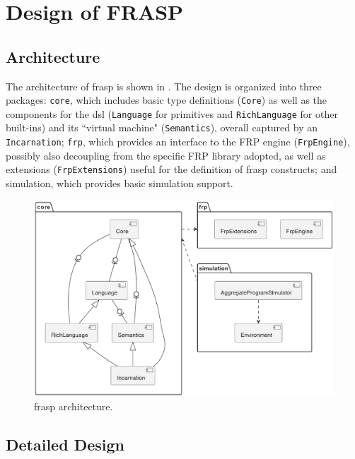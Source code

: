 \section{Design of FRASP}
\label{section:design-of-frasp}

\subsection{Architecture}

The architecture of \ac{frasp} is shown in . The design is organized into three packages: \texttt{core}, which includes basic type definitions (\texttt{Core}) as well as the components for the \ac{dsl} (\texttt{Language} for primitives and \texttt{RichLanguage} for other built-ins) and its ``virtual machine" (\texttt{Semantics}), overall captured by an \texttt{Incarnation}; \texttt{frp}, which provides an interface to the FRP engine (\texttt{FrpEngine}), possibly also decoupling from the specific FRP library adopted, as well as extensions (\texttt{FrpExtensions}) useful for the definition of \ac{frasp} constructs; and simulation, which provides basic simulation support.

\begin{figure}
    \centering
    \includegraphics[width=\linewidth]{figures/FRASP-architecture.png}
    \caption{\ac{frasp} architecture.}
    \label{fig:frasp-architecture}
\end{figure}

\subsection{Detailed Design}

